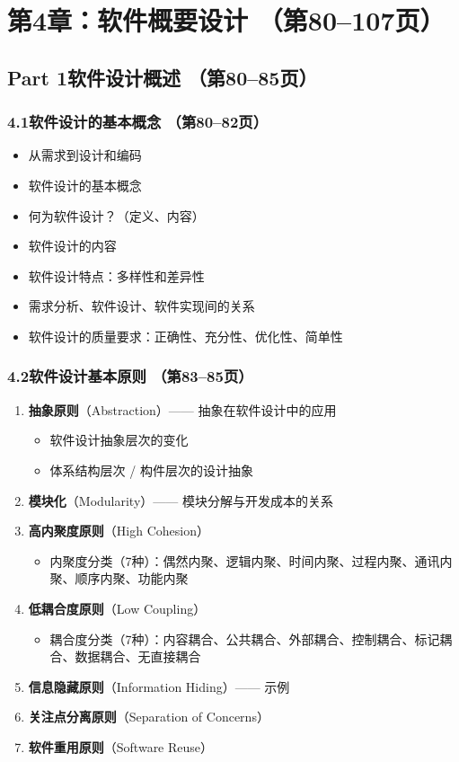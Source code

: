 \documentclass[12pt,a4paper]{ctexart}
\begin{document}
\section{第4章：软件概要设计 \hfill（第80--107页）}

\subsection{Part 1\quad 软件设计概述 \hfill（第80--85页）}

\subsubsection{4.1\quad 软件设计的基本概念 \hfill（第80--82页）}
\begin{itemize}
    \item 从需求到设计和编码
    \item 软件设计的基本概念
    \item 何为软件设计？（定义、内容）
    \item 软件设计的内容
    \item 软件设计特点：多样性和差异性
    \item 需求分析、软件设计、软件实现间的关系
    \item 软件设计的质量要求：正确性、充分性、优化性、简单性
\end{itemize}

\subsubsection{4.2\quad 软件设计基本原则 \hfill（第83--85页）}
\begin{enumerate}
    \item \textbf{抽象原则}（Abstraction）—— 抽象在软件设计中的应用
    \begin{itemize}
        \item 软件设计抽象层次的变化
        \item 体系结构层次 / 构件层次的设计抽象
    \end{itemize}
    \item \textbf{模块化}（Modularity）—— 模块分解与开发成本的关系
    \item \textbf{高内聚度原则}（High Cohesion）
    \begin{itemize}
        \item 内聚度分类（7种）：偶然内聚、逻辑内聚、时间内聚、过程内聚、通讯内聚、顺序内聚、功能内聚
    \end{itemize}
    \item \textbf{低耦合度原则}（Low Coupling）
    \begin{itemize}
        \item 耦合度分类（7种）：内容耦合、公共耦合、外部耦合、控制耦合、标记耦合、数据耦合、无直接耦合
    \end{itemize}
    \item \textbf{信息隐藏原则}（Information Hiding）—— 示例
    \item \textbf{关注点分离原则}（Separation of Concerns）
    \item \textbf{软件重用原则}（Software Reuse）
\end{enumerate}
\end{document}
